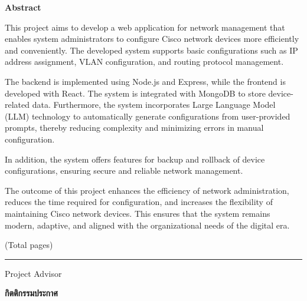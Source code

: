\vspace{5mm}
\begin{center}\textbf{Abstract}\end{center}

\hspace*{1.5em} %
This project aims to develop a web application for network management that enables system administrators to configure Cisco network devices more efficiently and conveniently. The developed system supports basic configurations such as IP address assignment, VLAN configuration, and routing protocol management.

\hspace*{1.5em} %
The backend is implemented using Node.js and Express, while the frontend is developed with React. The system is integrated with MongoDB to store device-related data. Furthermore, the system incorporates Large Language Model (LLM) technology to automatically generate configurations from user-provided prompts, thereby reducing complexity and minimizing errors in manual configuration.

\hspace*{1.5em} %
In addition, the system offers features for backup and rollback of device configurations, ensuring secure and reliable network management.

\hspace*{1.5em} %
The outcome of this project enhances the efficiency of network administration, reduces the time required for configuration, and increases the flexibility of maintaining Cisco network devices. This ensures that the system remains modern, adaptive, and aligned with the organizational needs of the digital era.

\begin{flushright}
(Total \pageref{LastPage} pages)

\vfill

\rule{12 cm}{0.4pt} Project Advisor

\end{flushright}


\newpage
{}
{}
\begin{center}\textbf{กิตติกรรมประกาศ}\end{center}

